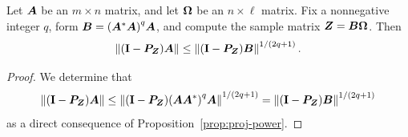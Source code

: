 \documentclass[final]{siamltex}
\newcommand{\pgnotate}[1]{{\color{blue}[#1]}}
\newcommand{\notate}[1]{\textcolor{red}{\textbf{[#1]}}}
\begin{document}



\lsp

\begin{theorem} \label{thm:power-method}
Let $\bm{A}$ be an $m\times n$ matrix, and let $\bm{\Omega}$ be an $n\times \ell$
matrix. Fix a nonnegative integer $q$, form $\bm{B} = {(\bm{A}^* \bm{A})}^q \bm{A}$,
and compute the sample matrix $\bm{Z} = \bm{B\Omega}$.  Then
$$
\left\Vert { (\mathbf{I}- \bm{P}_{\bm{Z}}) \bm{A} } \right\Vert
    \leq \left\Vert { (\mathbf{I}- \bm{P}_{\bm{Z}}) \bm{B} } \right\Vert^{1/(2q+1)}.
$$
\end{theorem}

\begin{proof}
We determine that
$$
\left\Vert { (\mathbf{I}- \bm{P}_{\bm{Z}}) \bm{A} } \right\Vert
    \leq \left\Vert { (\mathbf{I}- \bm{P}_{\bm{Z}}) {(\bm{AA}^*)}^q \bm{A} } \right\Vert^{1/(2q+1)}
    = \left\Vert { (\mathbf{I}- \bm{P}_{\bm{Z}}) \bm{B} } \right\Vert^{1/(2q+1)}
$$
as a direct consequence of Proposition~\ref{prop:proj-power}.
\end{proof}

\lsp

\end{document}
